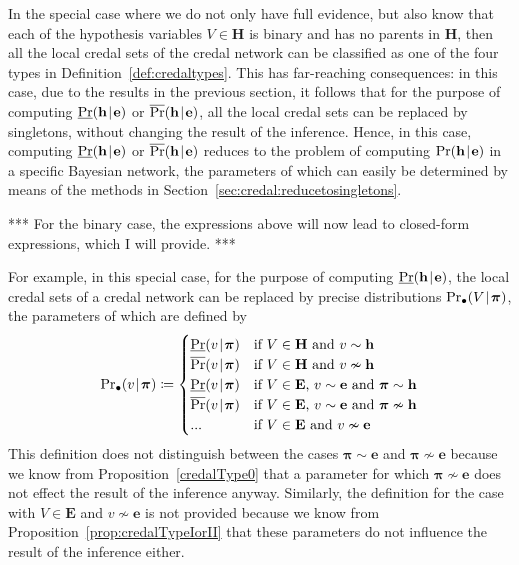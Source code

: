 \documentclass[10pt,a4paper]{paper}
\theoremstyle{definition}
\newcommand{\vbpi}{\boldsymbol\pi}
\newcommand{\hyp}{\mathbf{h}}
\newcommand{\ev}{\mathbf{e}}
\newcommand{\hyps}{\mathbf{H}}
\newcommand{\evs}{\mathbf{E}}
\newcommand{\newmid}{\hspace{0.9pt}\vert\hspace{0.9pt}}
\begin{document}
In the special case where we do not only have full evidence, but also know that each of the hypothesis variables $V\in\hyps$ is binary and has no parents in $\hyps$, then all the local credal sets of the credal network can be classified as one of the four types in Definition~\ref{def:credaltypes}. 
This has far-reaching consequences: in this case, due to the results in the previous section, it follows that for the purpose of computing $\underline{\Pr}(\hyp\newmid\ev)$ or $\overline{\Pr}(\hyp\newmid\ev)$, all the local credal sets can be replaced by singletons, without changing the result of the inference.
Hence, in this case, computing $\underline{\Pr}(\hyp\newmid\ev)$ or $\overline{\Pr}(\hyp\newmid\ev)$ reduces to the problem of computing $\Pr(\hyp\newmid\ev)$ in a specific Bayesian network, the parameters of which can easily be determined by means of the methods in Section~\ref{sec:credal:reducetosingletons}.

{\color{red}*** For the binary case, the expressions above will now lead to closed-form expressions, which I will provide. ***}

For example, in this special case, for the purpose of computing $\underline{\Pr}(\hyp\newmid\ev)$, the local credal sets of a credal network can be replaced by precise distributions ${\Pr}_{\bullet}(V\newmid\vbpi)$, the parameters of which are defined by
\vspace{-6pt}
\begin{equation}\label{eq:explicitsingletonslowercase}
{\Pr}_{\bullet}(v\newmid\vbpi)
\coloneqq
\begin{cases}
\underline{\Pr}(v\newmid\vbpi) &\text{if~$V\in\hyps$ and $v\sim\hyp$}\\
\overline{\Pr}(v\newmid\vbpi) &\text{if~$V\in\hyps$ and $v\nsim\hyp$}\\
\underline{\Pr}(v\newmid\vbpi) &\text{if~$V\in\evs$, $v\sim\ev$ and $\vbpi\sim\hyp$}\\
\overline{\Pr}(v\newmid\vbpi) &\text{if~$V\in\evs$, $v\sim\ev$ and $\vbpi\nsim\hyp$}\\
$...$ &\text{if~$V\in\evs$ and $v\nsim\ev$}
\end{cases}
\vspace{6pt}
\end{equation}
This definition does not distinguish between the cases $\vbpi\sim\ev$ and $\vbpi\nsim\ev$ because we know from Proposition~\ref{credalType0} that a parameter for which $\vbpi\nsim\ev$ does not effect the result of the inference anyway. Similarly, the definition for the case with $V\in\evs$ and $v\nsim\ev$ is not provided because we know from Proposition~\ref{prop:credalTypeIorII} that these parameters do not influence the result of the inference either.
\end{document}
